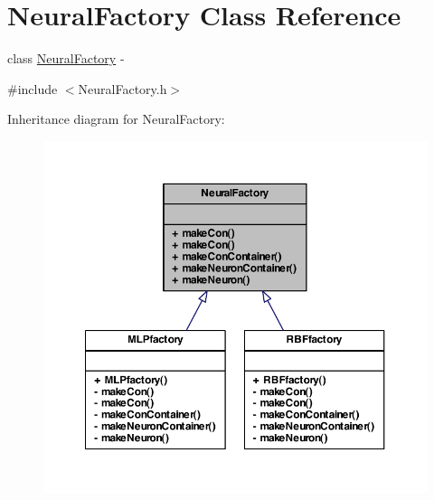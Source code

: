 \hypertarget{class_neural_factory}{
\section{NeuralFactory Class Reference}
\label{class_neural_factory}
}


class \hyperlink{class_neural_factory}{NeuralFactory} -\/  




{\ttfamily \#include $<$NeuralFactory.h$>$}



Inheritance diagram for NeuralFactory:\nopagebreak
\begin{figure}[H]
\begin{center}
\leavevmode
\includegraphics[width=362pt]{class_neural_factory__inherit__graph}
\end{center}
\end{figure}
